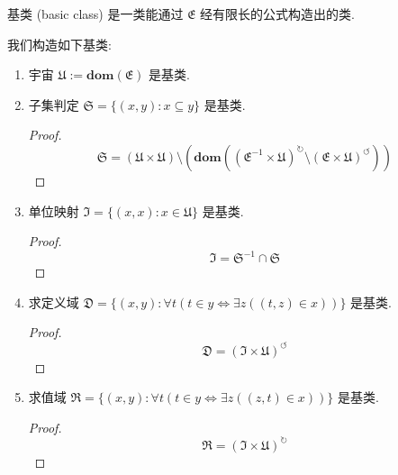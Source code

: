 \begin{definition}
    基类 (basic class) 是一类能通过 \(\mathfrak{E}\) 经有限长的公式构造出的类.
\end{definition}

\begin{definition}
    我们构造如下基类:
    \begin{enumerate}
        \item \label {definition:NBG basic class of universe}
                宇宙 \(\mathfrak{U} := \mathbf{dom} (\mathfrak{E})\) 是基类.
        \item \label {definition:NBG basic class of subset}
                子集判定 \(\mathfrak{S} = \{(x,y) : x \subseteq y\}\) 是基类.

                \begin{proof}
                    \[
                        \mathfrak{S} = (\mathfrak{U} \times \mathfrak{U}) \setminus (\mathbf{dom} ({(\mathfrak{E}^{-1} \times \mathfrak{U})}^{\circlearrowright} \setminus {(\mathfrak{E} \times \mathfrak{U})}^{\circlearrowleft}))
                    \]
                \end{proof}
        \item \label {definition:NBG basic class of id function}
                单位映射 \(\mathfrak{I} = \{(x,x) : x \in \mathfrak{U}\}\) 是基类.

                \begin{proof}
                    \[
                        \mathfrak{I} = \mathfrak{S}^{-1} \cap \mathfrak{S}
                    \]
                \end{proof}
        \item \label {definition:NBG basic class of domain}
                求定义域 \(\mathfrak{D} = \{(x,y) : \forall t (t \in y \iff \exists z ((t,z) \in x))\}\) 是基类.

                \begin{proof}
                    \[
                        \mathfrak{D} = {(\mathfrak{I} \times \mathfrak{U})}^{\circlearrowleft}
                    \]
                \end{proof}
        \item \label {definition:NBG basic class of range}
                求值域 \(\mathfrak{R} = \{(x,y) : \forall t (t \in y \iff \exists z ((z,t) \in x))\}\) 是基类.

                \begin{proof}
                    \[
                        \mathfrak{R} = {(\mathfrak{I} \times \mathfrak{U})}^{\circlearrowright}
                    \]
                \end{proof}
    \end{enumerate}
\end{definition}

